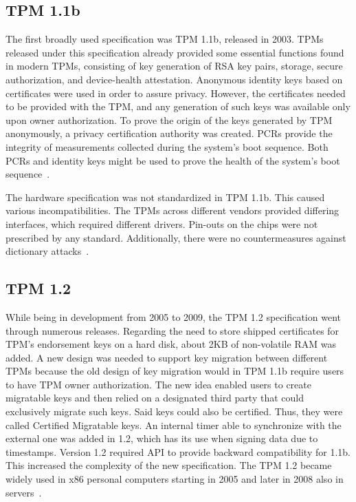 \subsection{TPM 1.1b}
The first broadly used specification was TPM 1.1b, released in 2003. TPMs released under this specification already provided some essential functions found in modern TPMs, consisting of key generation of RSA key pairs, storage, secure authorization, and device-health attestation. Anonymous identity keys based on certificates were used in order to assure privacy. However, the certificates needed to be provided with the TPM, and any generation of such keys was available only upon owner authorization. To prove the origin of the keys generated by TPM anonymously, a privacy certification authority was created. PCRs provide the integrity of measurements collected during the system's boot sequence. Both PCRs and identity keys might be used to prove the health of the system's boot sequence~\cite[p.~2]{arthur2015practical}.

The hardware specification was not standardized in TPM 1.1b. This caused various incompatibilities. The TPMs across different vendors provided differing interfaces, which required different drivers. Pin-outs on the chips were not prescribed by any standard. Additionally, there were no countermeasures against dictionary attacks~\cite[p.~2]{arthur2015practical}.

\subsection{TPM 1.2}
While being in development from 2005 to 2009, the TPM 1.2 specification went through numerous releases. Regarding the need to store shipped certificates for TPM's endorsement keys on a hard disk, about 2KB of non-volatile RAM was added. A new design was needed to support key migration between different TPMs because the old design of key migration would in TPM 1.1b require users to have TPM owner authorization. The new idea enabled users to create migratable keys and then relied on a designated third party that could exclusively migrate such keys. Said keys could also be certified. Thus, they were called Certified Migratable keys. An internal timer able to synchronize with the external one was added in 1.2, which has its use when signing data due to timestamps. Version 1.2 required API to provide backward compatibility for 1.1b. This increased the complexity of the new specification. The TPM 1.2 became widely used in x86 personal computers starting in 2005 and later in 2008 also in servers~\cite[p.~3]{arthur2015practical}.

